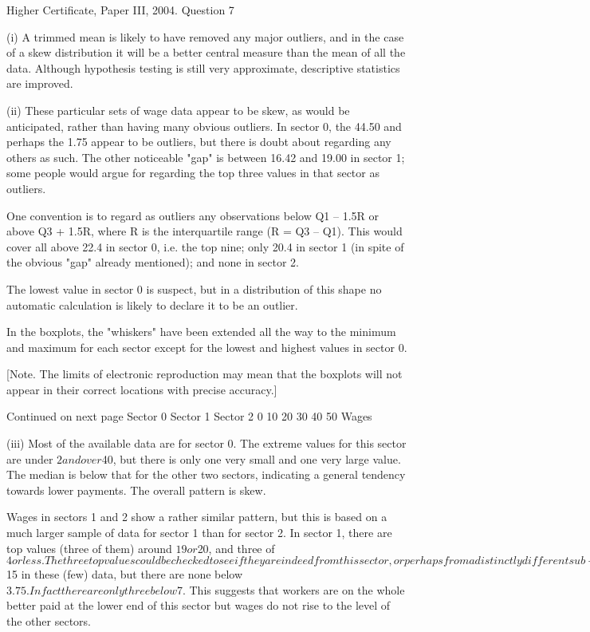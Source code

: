\documentclass[a4paper,12pt]{article}
\begin{document}
Higher Certificate, Paper III, 2004.  Question 7 
 
 
(i) A trimmed mean is likely to have removed any major outliers, and in the case of a skew distribution it will be a better central measure than the mean of all the data.  Although hypothesis testing is still very approximate, descriptive statistics are improved. 
 
 
(ii) These particular sets of wage data appear to be skew, as would be anticipated, rather than having many obvious outliers.  In sector 0, the 44.50 and perhaps the 1.75 appear to be outliers, but there is doubt about regarding any others as such.  The other noticeable "gap" is between 16.42 and 19.00 in sector 1;  some people would argue for regarding the top three values in that sector as outliers. 
 
One convention is to regard as outliers any observations below Q1 – 1.5R or above Q3 + 1.5R, where R is the interquartile range (R = Q3 – Q1).  This would cover all above 22.4 in sector 0, i.e. the top nine;  only 20.4 in sector 1 (in spite of the obvious "gap" already mentioned);  and none in sector 2. 
 
The lowest value in sector 0 is suspect, but in a distribution of this shape no automatic calculation is likely to declare it to be an outlier. 
 
In the boxplots, the "whiskers" have been extended all the way to the minimum and maximum for each sector except for the lowest and highest values in sector 0. 
 
 
 
 
 
 
 
 
 
 
[Note.  The limits of electronic reproduction may mean that the boxplots will not appear in their correct locations with precise accuracy.] 
 
 
 
Continued on next page 
Sector 0
Sector 1
Sector 2
0 10 20 30 40 50 Wages 

 
 
(iii) Most of the available data are for sector 0.  The extreme values for this sector are under $2 and over $40, but there is only one very small and one very large value.  The median is below that for the other two sectors, indicating a general tendency towards lower payments.  The overall pattern is skew. 
 
Wages in sectors 1 and 2 show a rather similar pattern, but this is based on a much larger sample of data for sector 1 than for sector 2.  In sector 1, there are top values (three of them) around $19 or $20, and three of $4 or less.  The three top values could be checked to see if they are indeed from this sector, or perhaps from a distinctly different sub-sector compared with the rest. 
 
Wages in sector 2 do not exceed $15 in these (few) data, but there are none below $3.75.  In fact there are only three below $7.  This suggests that workers are on the whole better paid at the lower end of this sector but wages do not rise to the level of the other sectors. 
 
 
\end{document}

